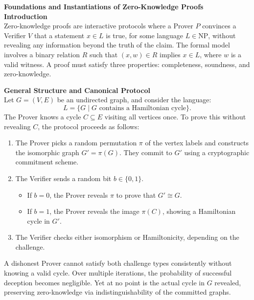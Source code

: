 \begin{technical}
{\Large\textbf{Foundations and Instantiations of Zero-Knowledge Proofs}}\\[0.7em]

\noindent\textbf{Introduction}\\[0.5em]
Zero-knowledge proofs are interactive protocols where a Prover \( P \) convinces a Verifier \( V \) that a statement \( x \in L \) is true, for some language \( L \in \text{NP} \), without revealing any information beyond the truth of the claim. The formal model involves a binary relation \( R \) such that \( (x, w) \in R \) implies \( x \in L \), where \( w \) is a valid witness. A proof must satisfy three properties: completeness, soundness, and zero-knowledge.

\noindent\textbf{General Structure and Canonical Protocol}\\[0.5em]
Let \( G = (V, E) \) be an undirected graph, and consider the language:
\[
L = \{ G \mid G \text{ contains a Hamiltonian cycle} \}.
\]
The Prover knows a cycle \( C \subseteq E \) visiting all vertices once. To prove this without revealing \( C \), the protocol proceeds as follows:

\begin{enumerate}
\item The Prover picks a random permutation \( \pi \) of the vertex labels and constructs the isomorphic graph \( G' = \pi(G) \). They commit to \( G' \) using a cryptographic commitment scheme.
\item The Verifier sends a random bit \( b \in \{0, 1\} \).
\begin{itemize}
\item If \( b = 0 \), the Prover reveals \( \pi \) to prove that \( G' \cong G \).
\item If \( b = 1 \), the Prover reveals the image \( \pi(C) \), showing a Hamiltonian cycle in \( G' \).
\end{itemize}
\item The Verifier checks either isomorphism or Hamiltonicity, depending on the challenge.
\end{enumerate}

A dishonest Prover cannot satisfy both challenge types consistently without knowing a valid cycle. Over multiple iterations, the probability of successful deception becomes negligible. Yet at no point is the actual cycle in \( G \) revealed, preserving zero-knowledge via indistinguishability of the committed graphs.


\end{technical}
